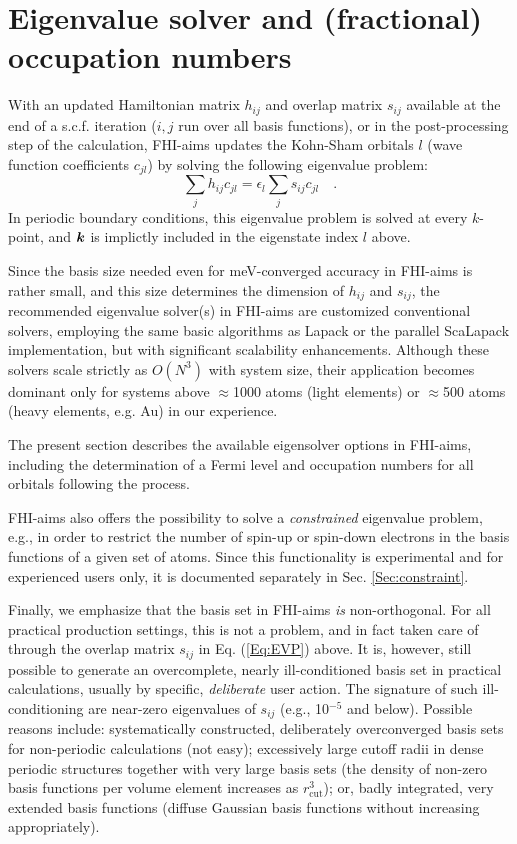 \section{Eigenvalue solver and (fractional) occupation numbers} 
\label{Sec:EV}

With an updated Hamiltonian matrix $h_{ij}$ and overlap matrix
$s_{ij}$ available at the end of a s.c.f. iteration ($i,j$ run over
all basis functions), or in the post-processing step of the
calculation, FHI-aims updates the Kohn-Sham orbitals $l$ (wave
function coefficients $c_{jl}$) by solving the following eigenvalue
problem:  
\begin{equation}\label{Eq:EVP}
  \sum_j h_{ij} c_{jl} = \epsilon_l \sum_j s_{ij} c_{jl} \quad .
\end{equation}
In periodic boundary conditions, this eigenvalue problem is solved at
every $k$-point, and $\mbox{\boldmath$k$}$ is implictly included in the eigenstate
index $l$ above.

Since the basis size needed even for meV-converged accuracy in
FHI-aims is rather small, and this size determines the dimension of
$h_{ij}$ and $s_{ij}$, the recommended eigenvalue solver(s) in
FHI-aims are customized conventional solvers, employing the same basic
algorithms as Lapack or the parallel ScaLapack implementation, but with
significant scalability enhancements. Although these solvers scale strictly as
$O(N^3)$ with system size, their application becomes dominant only for systems 
above $\approx$1000 atoms (light elements) or $\approx$500 atoms
(heavy elements, e.g. Au) in our experience. 

The present section describes the available eigensolver options in
FHI-aims, including the determination of a Fermi level and occupation
numbers for all orbitals following the process. 

FHI-aims also offers
the possibility to solve a \emph{constrained} eigenvalue problem,
e.g., in order to restrict the number of spin-up or spin-down
electrons in the basis functions of a given set of atoms. Since this
functionality is experimental and for experienced users only, it is
documented separately in Sec. \ref{Sec:constraint}.

Finally, we emphasize that the basis set in FHI-aims \emph{is}
non-orthogonal. For all practical production settings, this is not a problem,
and in fact taken care of through the overlap matrix $s_{ij}$ in
Eq. (\ref{Eq:EVP}) above. It is, however, still possible to generate an
overcomplete, nearly ill-conditioned basis set in practical calculations,
usually by specific, \emph{deliberate} user action. The signature of such
ill-conditioning are near-zero eigenvalues of $s_{ij}$ (e.g., 10$^{-5}$ and
below). Possible reasons include: systematically constructed, deliberately overconverged
basis sets for non-periodic calculations (not easy); excessively large cutoff
radii in dense periodic structures together with very large basis sets (the
density of non-zero basis functions per volume element increases as
$r_\text{cut}^3$); or, badly integrated, very extended basis functions
(diffuse Gaussian basis functions without increasing
 appropriately).

